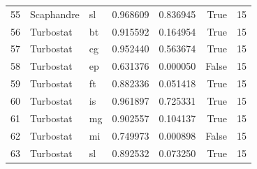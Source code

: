 \begin{tabular}{lllrrrr}
55 & Scaphandre & sl & 0.968609 & 0.836945 & True & 15 \\
56 & Turbostat & bt & 0.915592 & 0.164954 & True & 15 \\
57 & Turbostat & cg & 0.952440 & 0.563674 & True & 15 \\
58 & Turbostat & ep & 0.631376 & 0.000050 & False & 15 \\
59 & Turbostat & ft & 0.882336 & 0.051418 & True & 15 \\
60 & Turbostat & is & 0.961897 & 0.725331 & True & 15 \\
61 & Turbostat & mg & 0.902557 & 0.104137 & True & 15 \\
62 & Turbostat & mi & 0.749973 & 0.000898 & False & 15 \\
63 & Turbostat & sl & 0.892532 & 0.073250 & True & 15 \\
\bottomrule
\end{tabular}
